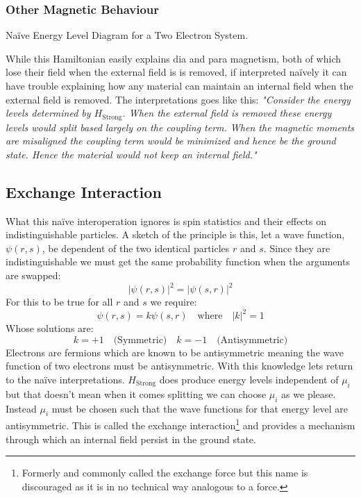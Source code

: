 \subsubsection{Other Magnetic Behaviour}
\begin{center}

Naïve Energy Level Diagram for a Two Electron System.
\end{center}
While this Hamiltonian easily explains dia and para magnetism,
both of which lose their field when the external field is is removed,
if interpreted naïvely it can have trouble explaining how any material can maintain an internal field when the external field is removed.
The interpretations goes like this:
{\em "Consider the energy levels determined by $H_\text{Strong}$.
When the external field is removed these energy levels would split based largely on the coupling term.
When the magnetic moments are misaligned the coupling term would be minimized and hence be the ground state.
Hence the material would not keep an internal field."}

\subsection{Exchange Interaction}
What this naïve interoperation ignores is spin statistics and their effects on indistinguishable particles.
A sketch of the principle is this, 
let a wave function, $\psi(r,s)$, be dependent of the two identical particles $r$ and $s$.
Since they are indistinguishable we must get the same probability function when the arguments are swapped:
\[|\psi(r,s)|^2=|\psi(s,r)|^2\]
For this to be true for all $r$ and $s$ we require:
\[\psi(r,s) = k\psi(s,r)\quad\text{where}\quad |k|^2=1\]
Whose solutions are:
\[k=+1\quad\text{(Symmetric)}\quad k=-1\quad\text{(Antisymmetric)}\]
Electrons are fermions which are known to be antisymmetric meaning the wave function of two electrons must be antisymmetric. 
With this knowledge lets return to the naïve interpretations.
$H_\text{Strong}$ does produce energy levels independent of $\mu_i$ but that doesn't mean when it comes splitting we can choose $\mu_i$ as we please.
Instead $\mu_i$ must be chosen such that the wave functions for that energy level are antisymmetric.
This is called the exchange interaction\footnote{Formerly and commonly called the exchange force but this name is discouraged as it is in no technical way analogous to a force.} and provides a mechanism through which an internal field persist in the ground state.

